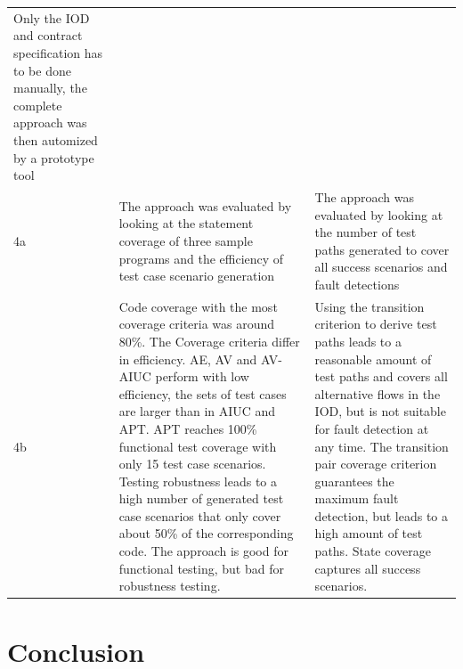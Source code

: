 \begin{longtable}[h]{p{0.5cm}p{}p{}}
	Only the IOD and contract specification has to be done manually, the complete approach was then automized by a prototype tool \\
	4a & 
	The approach was evaluated by looking at the statement coverage of three sample programs and the efficiency of test case scenario generation & 
	The approach was evaluated by looking at the number of test paths generated to cover all success scenarios and fault detections \\
	4b &
	Code coverage with the most coverage criteria was around 80\%. The Coverage criteria differ in efficiency. AE, AV and AV-AIUC perform with low efficiency, the sets of test cases are larger than in AIUC and APT. APT reaches 100\% functional test coverage with only 15 test case scenarios. Testing robustness leads to a high number of generated test case scenarios that only cover about 50\% of the corresponding code. The approach is good for functional testing, but bad for robustness testing. &
	Using the transition criterion to derive test paths leads to a reasonable amount of test paths and covers all alternative flows in the IOD, but is not suitable for fault detection at any time. The transition pair coverage criterion guarantees the maximum fault detection, but leads to a high amount of test paths. State coverage captures all success scenarios. \\
\end{longtable}

\section{Conclusion} \label{conclusion}

